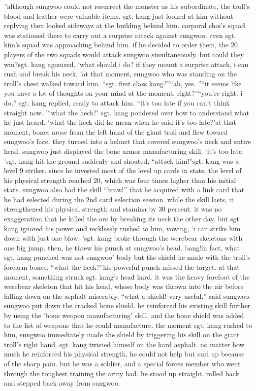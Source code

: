 ”although sungwoo could not resurrect the monster as his subordinate, the troll’s blood and leather were valuable items.
sgt.
 kang just looked at him without replying then looked sideways at the building behind him.
 corporal choi’s squad was stationed there to carry out a surprise attack against sungwoo.
even sgt.
 kim’s squad was approaching behind him.
 if he decided to order them, the 20 players of the two squads would attack sungwoo simultaneously.
but could they win?sgt.
 kang agonized, ‘what should i do? if they mount a surprise attack, i can rush and break his neck.
’at that moment, sungwoo who was standing on the troll’s chest walked toward him.
“sgt.
 first class kang?”“ah, yes.
”“it seems like you have a lot of thoughts on your mind at the moment.
 right?”“you’re right.
 i do,” sgt.
 kang replied, ready to attack him.
“it’s too late if you can’t think straight now.
”‘what the heck?’ sgt.
 kang pondered over how to understand what he just heard.
‘what the heck did he mean when he said it’s too late?’at that moment, bones arose from the left hand of the giant troll and flew toward sungwoo’s face.
 they turned into a helmet that covered sungwoo’s neck and entire head.
 sungwoo just displayed the bone armor manufacturing skill.
‘it’s too late.
’sgt.
 kang hit the ground suddenly and shouted, “attack him!”sgt.
 kang was a level 9 striker.
 since he invested most of the level up cards in stats, the level of his physical strength reached 20, which was four times higher than his initial stats.
sungwoo also had the skill “brawl” that he acquired with a link card that he had selected during the 2nd card selection session.
 while the skill lasts, it strengthened his physical strength and stamina by 30 percent.
 it was no exaggeration that he killed the orc by breaking its neck the other day.
but sgt.
 kang ignored his power and recklessly rushed to him, vowing, ‘i can strike him down with just one blow.
’sgt.
 kang broke through the werebear skeletons with one big jump.
then, he threw his punch at sungwoo’s head.
bang!in fact, what sgt.
 kang punched was not sungwoo’ body but the shield he made with the troll’s forearm bones.
“what the heck?”his powerful punch missed the target.
at that moment, something struck sgt.
 kang’s head hard.
 it was the heavy forefoot of the werebear skeleton that hit his head, whose body was thrown into the air before falling down on the asphalt miserably.
“what a shield! very useful,” said sungwoo.
sungwoo put down the cracked bone shield.
 he reinforced his existing skill further by using the ‘bone weapon manufacturing’ skill, and the bone shield was added to the list of weapons that he could manufacture.
the moment sgt.
 kang rushed to him, sungwoo immediately made the shield by triggering his skill on the giant troll’s right hand.
sgt.
 kang twisted himself on the hard asphalt.
 no matter how much he reinforced his physical strength, he could not help but curl up because of the sharp pain.
but he was a soldier, and a special forces member who went through the toughest training the army had.
he stood up straight, rolled back and stepped back away from sungwoo.


